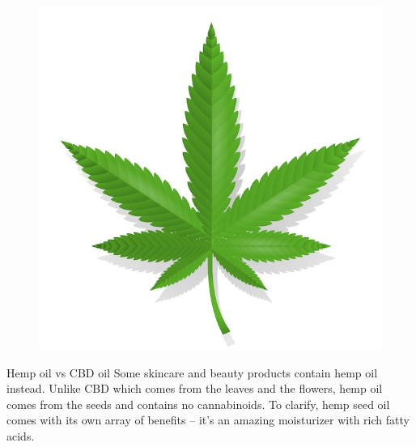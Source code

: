 \documentclass{beamer}
\begin{document}
\begin{frame}
\begin{figure}[H]
     \hspace {0.5in}
    \includegraphics[scale=0.24]{images/lef.jpg}
  \label{fig:twopicture} 
\end{figure}
     \end{frame}
     \begin{frame}{Hemp oil vs CBD oil}
         Some skincare and beauty products contain hemp oil instead. Unlike CBD which comes from the leaves and the flowers, hemp oil comes from the seeds and contains no cannabinoids. To clarify, hemp seed oil comes with its own array of benefits – it’s an amazing moisturizer with rich fatty acids. 
         


     \end{frame}
    
\end{document}
